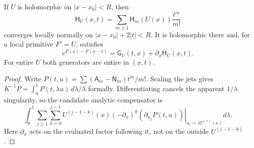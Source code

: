 \begin{theorem}\label{ngp:analytic}
If $U$ is holomorphic on $|x-x_0|<R$, then
\begin{equation}\label{ngp:analytic-series}
 \mathsf H_U(x,t)=\sum_{m\ge1}\mathsf H_m(U(x))\frac{t^m}{m!}
\end{equation}
converges locally normally on $|x-x_0|+2|t|<R$. It is holomorphic
there and, for a local primitive $F'=U$, satisfies
\begin{equation}\label{ngp:translation}
 \boxed{e^{F(x)-F(x-t)}=\mathsf G_U(t,x)+\partial_x\mathsf H_U(x,t).}
\end{equation}
For entire $U$ both generators are entire in $(x,t)$.
\end{theorem}
\begin{proof}
Write $P(t,u)=\sum(\mathsf A_m-\mathsf N_m)t^m/m!$.
Scaling the jets gives
$K^{-1}P=\int_0^1P(t,\lambda u)\,d\lambda/\lambda$ formally.
Differentiating cancels the apparent $1/\lambda$ singularity, so the
candidate analytic compensator is
\begin{equation}\label{ngp:analytic-homotopy}
 \int_0^1\sum_{j\ge1}\sum_{k=0}^{j-1}
 U^{(j-1-k)}(x)(-\partial_x)^k
 \left.(\partial_{u_j}P(t,u))\right|_{u_r=\lambda U^{(r)}(x)}d\lambda.
\end{equation}
Here $\partial_x$ acts on the evaluated factor following it, not on
the outside $U^{(j-1-k)}$.


\end{proof}
